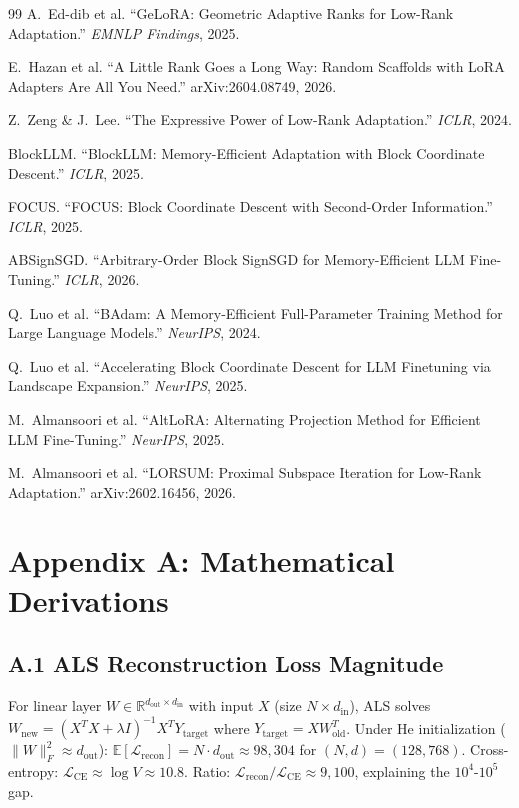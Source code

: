\documentclass[11pt]{article}
\begin{document}
\begin{thebibliography}{99}
 A.~Ed-dib et al. ``GeLoRA: Geometric Adaptive Ranks for Low-Rank Adaptation.'' \textit{EMNLP Findings}, 2025.

 E.~Hazan et al. ``A Little Rank Goes a Long Way: Random Scaffolds with LoRA Adapters Are All You Need.'' arXiv:2604.08749, 2026.

 Z.~Zeng \& J.~Lee. ``The Expressive Power of Low-Rank Adaptation.'' \textit{ICLR}, 2024.

 BlockLLM. ``BlockLLM: Memory-Efficient Adaptation with Block Coordinate Descent.'' \textit{ICLR}, 2025.

 FOCUS. ``FOCUS: Block Coordinate Descent with Second-Order Information.'' \textit{ICLR}, 2025.

 ABSignSGD. ``Arbitrary-Order Block SignSGD for Memory-Efficient LLM Fine-Tuning.'' \textit{ICLR}, 2026.

 Q.~Luo et al. ``BAdam: A Memory-Efficient Full-Parameter Training Method for Large Language Models.'' \textit{NeurIPS}, 2024.

 Q.~Luo et al. ``Accelerating Block Coordinate Descent for LLM Finetuning via Landscape Expansion.'' \textit{NeurIPS}, 2025.

 M.~Almansoori et al. ``AltLoRA: Alternating Projection Method for Efficient LLM Fine-Tuning.'' \textit{NeurIPS}, 2025.

 M.~Almansoori et al. ``LORSUM: Proximal Subspace Iteration for Low-Rank Adaptation.'' arXiv:2602.16456, 2026.

\end{thebibliography}

\section*{Appendix A: Mathematical Derivations}
\label{sec:appendix-derivations}

\subsection*{A.1 ALS Reconstruction Loss Magnitude}

For linear layer $W \in \mathbb{R}^{d_{\text{out}} \times d_{\text{in}}}$ with input $X$ (size $N \times d_{\text{in}}$), ALS solves $W_{\text{new}} = (X^T X + \lambda I)^{-1} X^T Y_{\text{target}}$ where $Y_{\text{target}} = X W_{\text{old}}^T$. Under He initialization ($\|W\|_F^2 \approx d_{\text{out}}$): $\mathbb{E}[\mathcal{L}_{\text{recon}}] = N \cdot d_{\text{out}} \approx 98,304$ for $(N,d) = (128, 768)$. Cross-entropy: $\mathcal{L}_{\text{CE}} \approx \log V \approx 10.8$. Ratio: $\mathcal{L}_{\text{recon}} / \mathcal{L}_{\text{CE}} \approx 9,100$, explaining the $10^4$-$10^5$ gap.
\end{document}
